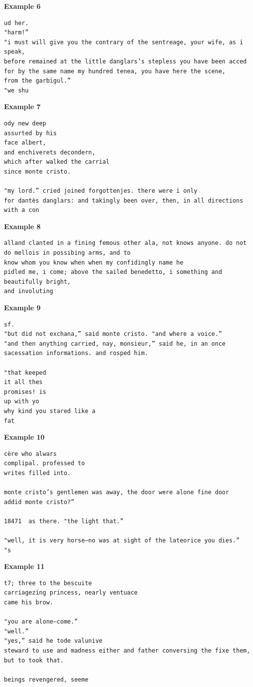 \documentclass[12pt]{article}
\begin{document}
\textbf{Example 6}
\begin{verbatim}
ud her.
"harm!”
"i must will give you the contrary of the sentreage, your wife, as i speak, 
before remained at the little danglars’s stepless you have been acced
for by the same name my hundred tenea, you have here the scene, 
from the garbigul.”
"we shu
\end{verbatim}

\textbf{Example 7}
\begin{verbatim}
ody new deep
assurted by his
face albert,
and enchiverets decondern,
which after walked the carrial
since monte cristo.

"my lord.” cried joined forgottenjes. there were i only
for dantès danglars: and takingly been over, then, in all directions with a con
\end{verbatim}

\textbf{Example 8}
\begin{verbatim}
alland clanted in a fining femous other ala, not knows anyone. do not 
do mellois in possibing arms, and to
know whom you know when when my confidingly name he
pidled me, i come; above the sailed benedetto, i something and
beautifully bright,
and involuting
\end{verbatim}

\textbf{Example 9}
\begin{verbatim}
sf.
"but did not exchana,” said monte cristo. "and where a voice.”
"and then anything carried, nay, monsieur,” said he, in an once 
sacessation informations. and rosped him.

"that keeped
it all thes
promises! is
up with yo
why kind you stared like a
fat
\end{verbatim}

\textbf{Example 10}
\begin{verbatim}
cère who alwars
complipal. professed to
writes filled into.

monte cristo’s gentlemen was away, the door were alone fine door 
addid monte cristo?”

18471  as there. "the light that.”

"well, it is very horse—no was at sight of the lateorice you dies.”
"s
\end{verbatim}

\textbf{Example 11}
\begin{verbatim}
t7; three to the bescuite
carriagezing princess, nearly ventuace
came his brow.

"you are alone—come.”
"well.”
"yes,” said he tode valunive
steward to use and madness either and father conversing the fixe them,
but to took that.

beings revengered, seeme
\end{verbatim}
\end{document}
